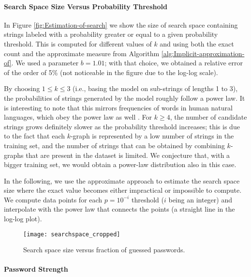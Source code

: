 \documentclass[a4paper,twocolumn]{article}
\begin{document}
\paragraph{Search Space Size Versus Probability Threshold}

In Figure \ref{fig:Estimation-of-search} we show the size of search
space containing strings labeled with a probability greater or equal
to a given probability threshold. This is computed for different values
of $k$ and using both the exact count and the approximate measure
from Algorithm \ref{alg:Implicit-approximation-of}. We used a parameter
$b=1.01$; with that choice, we obtained a relative error of the order
of 5\% (not noticeable in the figure due to the log-log scale).

By choosing $1\leq k\leq3$ (i.e., basing the model on sub-strings
of lengths 1 to 3), the probabilities of strings generated by the
model roughly follow a power law. It is interesting to note that this
mirrors frequencies of words in human natural languages, which obey
the power law as well \cite{Zipf1949Human}. For $k\geq4$, the number
of candidate strings grows definitely slower as the probability threshold
increases; this is due to the fact that each $k$-graph is represented
by a low number of strings in the training set, and the number of
strings that can be obtained by combining $k$-graphs that are present
in the dataset is limited. We conjecture that, with a bigger training
set, we would obtain a power-law distribution also in this case.

In the following, we use the approximate approach to estimate the
search space size where the exact value becomes either impractical
or impossible to compute. We compute data points for each $p=10^{-i}$
threshold ($i$ being an integer) and interpolate with the power law
that connects the points (a straight line in the log-log plot).

\begin{figure}
\begin{centering}
\texttt{[image: searchspace\_cropped]}
\par\end{centering}

\caption{\label{fig:Search-space}Search space size versus fraction of guessed
passwords.}



\end{figure}



\paragraph{Password Strength}
\end{document}
